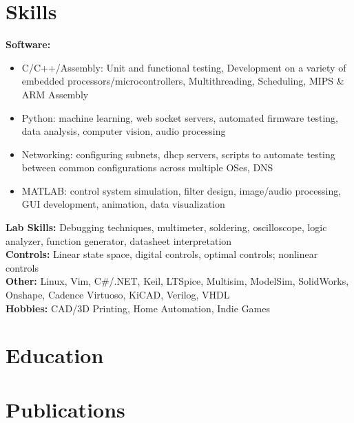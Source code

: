 \documentclass[11pt, a4paper]{article}
\begin{document}
\section*{Skills}
{\scriptsize
  \textbf{Software:}
  \begin{itemize}[noitemsep] %
    \item C/C++/Assembly: Unit and functional testing, Development on a variety of embedded processors/microcontrollers, Multithreading, Scheduling, MIPS \& ARM Assembly
    \item Python: machine learning, web socket servers, automated firmware testing, data analysis, computer vision, audio processing
    \item Networking: configuring subnets, dhcp servers, scripts to automate testing between common configurations across multiple OSes, DNS
    \item MATLAB: control system simulation, filter design, image/audio processing, GUI development, animation, data visualization
  \end{itemize}
  \textbf{Lab Skills:} Debugging techniques, multimeter, soldering, oscilloscope, logic analyzer, function generator, datasheet interpretation\\
  \textbf{Controls:} Linear state space, digital controls, optimal controls; nonlinear controls\\
  \textbf{Other:} Linux, Vim, C\#/.NET, Keil, LTSpice, Multisim, ModelSim, SolidWorks, Onshape, Cadence Virtuoso, KiCAD, Verilog, VHDL\\
  \textbf{Hobbies:} CAD/3D Printing, Home Automation, Indie Games\par\noindent
}

\section*{Education}
{\scriptsize
  \educationWithDuration
}

\section*{Publications}
{\scriptsize
  \publications
}

\end{document}
